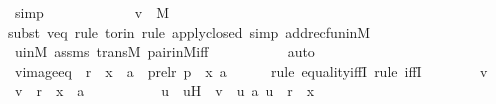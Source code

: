 \begin{isabellebody}
\ simp\isanewline
\ \ \ \ \isanewline
\ \ \ \ \ \ \isamarkupfalse%
\ {\isachardoublequoteopen}v\ {\isasymin}\ M{\isachardoublequoteclose}\ \isanewline
\ \ \ \ \ \ \ \ \isamarkupfalse%
{\isacharparenleft}{\kern0pt}subst\ veq{\isacharcomma}{\kern0pt}\ rule\ to{\isacharunderscore}{\kern0pt}rin{\isacharcomma}{\kern0pt}\ rule\ apply{\isacharunderscore}{\kern0pt}closed{\isacharcomma}{\kern0pt}\ simp\ add{\isacharcolon}{\kern0pt}recfun{}inM{\isacharparenright}{\kern0pt}\isanewline
\ \ \ \ \ \ \ \ \isamarkupfalse%
\ uinM\ assms\ transM\ pair{\isacharunderscore}{\kern0pt}in{\isacharunderscore}{\kern0pt}M{\isacharunderscore}{\kern0pt}iff\ \isanewline
\ \ \ \ \ \ \ \ \isamarkupfalse%
\ auto\isanewline
\ \ \ \ \isamarkupfalse%
\isanewline
\isanewline
\isanewline
\ \ \ \ \isamarkupfalse%
\ vimageeq\ {\isacharcolon}{\kern0pt}\ {\isachardoublequoteopen}r\ {\isacharminus}{\kern0pt}{\isacharbackquote}{\kern0pt}{\isacharbackquote}{\kern0pt}\ {\isacharbraceleft}{\kern0pt}x{\isacharbraceright}{\kern0pt}\ {\isasymtimes}\ {\isacharbraceleft}{\kern0pt}a{\isacharbraceright}{\kern0pt}\ {\isacharequal}{\kern0pt}\ prel{\isacharparenleft}{\kern0pt}r{\isacharcomma}{\kern0pt}\ p{\isacharparenright}{\kern0pt}\ {\isacharminus}{\kern0pt}{\isacharbackquote}{\kern0pt}{\isacharbackquote}{\kern0pt}\ {\isacharbraceleft}{\kern0pt}{\isasymlangle}x{\isacharcomma}{\kern0pt}\ a{\isasymrangle}{\isacharbraceright}{\kern0pt}{\isachardoublequoteclose}\ \isanewline
\ \ \ \ \isamarkupfalse%
{\isacharparenleft}{\kern0pt}rule\ equality{\isacharunderscore}{\kern0pt}iffI{\isacharcomma}{\kern0pt}\ rule\ iffI{\isacharparenright}{\kern0pt}\isanewline
\ \ \ \ \ \ \isamarkupfalse%
\ v\ \isamarkupfalse%
\ {\isachardoublequoteopen}v\ {\isasymin}\ r\ {\isacharminus}{\kern0pt}{\isacharbackquote}{\kern0pt}{\isacharbackquote}{\kern0pt}\ {\isacharbraceleft}{\kern0pt}x{\isacharbraceright}{\kern0pt}\ {\isasymtimes}\ {\isacharbraceleft}{\kern0pt}a{\isacharbraceright}{\kern0pt}{\isachardoublequoteclose}\ \isanewline
\ \ \ \ \ \ \isamarkupfalse%
\ \isamarkupfalse%
\ u\ \ uH\ {\isacharcolon}{\kern0pt}\ {\isachardoublequoteopen}v\ {\isacharequal}{\kern0pt}\ {\isacharless}{\kern0pt}u{\isacharcomma}{\kern0pt}\ a{\isachargreater}{\kern0pt}{\isachardoublequoteclose}\ {\isachardoublequoteopen}u\ {\isasymin}\ r\ {\isacharminus}{\kern0pt}{\isacharbackquote}{\kern0pt}{\isacharbackquote}{\kern0pt}\ {\isacharbraceleft}{\kern0pt}x{\isacharbraceright}{\kern0pt}{\isachardoublequoteclose}\ \isamarkupfalse%

\end{isabellebody}
